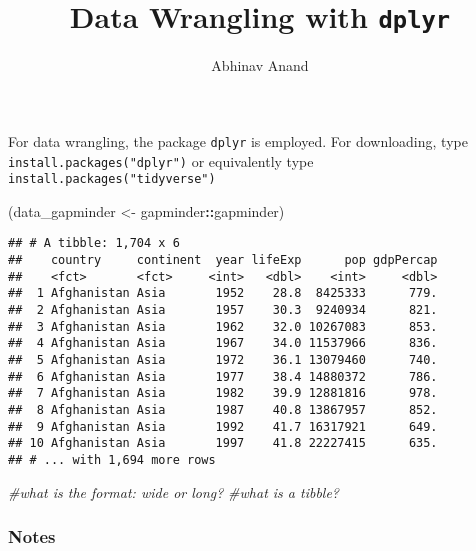\documentclass[]{article}
\title{Data Wrangling with \texttt{dplyr}}
\author{Abhinav Anand}
\date{}
\newenvironment{Shaded}{\begin{snugshade}}{\end{snugshade}}
\newcommand{\StringTok}[1]{\textcolor[rgb]{0.31,0.60,0.02}{#1}}
\newcommand{\CommentTok}[1]{\textcolor[rgb]{0.56,0.35,0.01}{\textit{#1}}}
\newcommand{\OperatorTok}[1]{\textcolor[rgb]{0.81,0.36,0.00}{\textbf{#1}}}
\newcommand{\NormalTok}[1]{#1}
\begin{document}
\maketitle

For data wrangling, the package \texttt{dplyr} is employed. For
downloading, type \texttt{install.packages("dplyr")} or equivalently
type \texttt{install.packages("tidyverse")}

\begin{Shaded}
\begin{Highlighting}[]
\NormalTok{(data_gapminder <-}\StringTok{ }\NormalTok{gapminder}\OperatorTok{::}\NormalTok{gapminder)}
\end{Highlighting}
\end{Shaded}

\begin{verbatim}
## # A tibble: 1,704 x 6
##    country     continent  year lifeExp      pop gdpPercap
##    <fct>       <fct>     <int>   <dbl>    <int>     <dbl>
##  1 Afghanistan Asia       1952    28.8  8425333      779.
##  2 Afghanistan Asia       1957    30.3  9240934      821.
##  3 Afghanistan Asia       1962    32.0 10267083      853.
##  4 Afghanistan Asia       1967    34.0 11537966      836.
##  5 Afghanistan Asia       1972    36.1 13079460      740.
##  6 Afghanistan Asia       1977    38.4 14880372      786.
##  7 Afghanistan Asia       1982    39.9 12881816      978.
##  8 Afghanistan Asia       1987    40.8 13867957      852.
##  9 Afghanistan Asia       1992    41.7 16317921      649.
## 10 Afghanistan Asia       1997    41.8 22227415      635.
## # ... with 1,694 more rows
\end{verbatim}

\begin{Shaded}
\begin{Highlighting}[]
\CommentTok{#what is the format: wide or long?}
\CommentTok{#what is a tibble?}
\end{Highlighting}
\end{Shaded}

\subsubsection{Notes}\label{notes}
\end{document}
